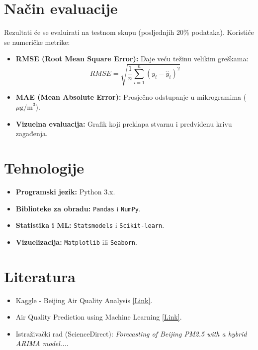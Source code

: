 \documentclass[12pt]{article}
\begin{document}
	\section{Način evaluacije}
	Rezultati će se evaluirati na testnom skupu (posljednjih 20\% podataka). Koristiće se numeričke metrike:
	\begin{itemize}
		\item \textbf{RMSE (Root Mean Square Error):} Daje veću težinu velikim greškama:
		\[ RMSE = \sqrt{\frac{1}{n}\sum_{i=1}^{n}(y_i - \hat{y}_i)^2} \]
		\item \textbf{MAE (Mean Absolute Error):} Prosječno odstupanje u mikrogramima ($\mu\text{g/m}^3$).
		\item \textbf{Vizuelna evaluacija:} Grafik koji preklapa stvarnu i predviđenu krivu zagađenja.
	\end{itemize}
	
	\section{Tehnologije}
	\begin{itemize}
		\item \textbf{Programski jezik:} Python 3.x.
		\item \textbf{Biblioteke za obradu:} \texttt{Pandas} i \texttt{NumPy}.
		\item \textbf{Statistika i ML:} \texttt{Statsmodels} i \texttt{Scikit-learn}.
		\item \textbf{Vizuelizacija:} \texttt{Matplotlib} ili \texttt{Seaborn}.
	\end{itemize}
	
	\section{Literatura}
	\begin{itemize}
		\item Kaggle - Beijing Air Quality Analysis \href{https://www.kaggle.com/datasets/sid321axn/beijing-multisite-airquality-data-set}{[Link]}.
		\item Air Quality Prediction using Machine Learning \href{https://github.com/topics/air-quality-prediction}{[Link]}.
		\item Istraživački rad (ScienceDirect): \textit{Forecasting of Beijing PM2.5 with a hybrid ARIMA model...}.
	\end{itemize}
	
\end{document}
